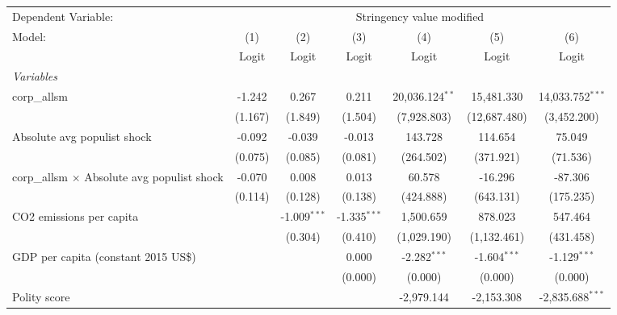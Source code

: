 
\begingroup
\centering
\begin{tabular}{lcccccc}
   \toprule
   Dependent Variable: & \multicolumn{6}{c}{Stringency value modified}\\
   Model:                                             & (1)     & (2)            & (3)            & (4)               & (5)            & (6)\\  
                                                      &  Logit  & Logit          & Logit          & Logit             & Logit          & Logit\\  
   \midrule
   \emph{Variables}\\
   corp\_allsm                                        & -1.242  & 0.267          & 0.211          & 20,036.124$^{**}$ & 15,481.330     & 14,033.752$^{***}$\\   
                                                      & (1.167) & (1.849)        & (1.504)        & (7,928.803)       & (12,687.480)   & (3,452.200)\\   
   Absolute avg populist shock                        & -0.092  & -0.039         & -0.013         & 143.728           & 114.654        & 75.049\\   
                                                      & (0.075) & (0.085)        & (0.081)        & (264.502)         & (371.921)      & (71.536)\\   
   corp\_allsm $\times$ Absolute avg populist shock   & -0.070  & 0.008          & 0.013          & 60.578            & -16.296        & -87.306\\   
                                                      & (0.114) & (0.128)        & (0.138)        & (424.888)         & (643.131)      & (175.235)\\   
   CO2 emissions per capita                           &         & -1.009$^{***}$ & -1.335$^{***}$ & 1,500.659         & 878.023        & 547.464\\   
                                                      &         & (0.304)        & (0.410)        & (1,029.190)       & (1,132.461)    & (431.458)\\   
   GDP per capita (constant 2015 US\$)                &         &                & 0.000          & -2.282$^{***}$    & -1.604$^{***}$ & -1.129$^{***}$\\   
                                                      &         &                & (0.000)        & (0.000)           & (0.000)        & (0.000)\\   
   Polity score                                       &         &                &                & -2,979.144        & -2,153.308     & -2,835.688$^{***}$\\   

\end{tabular}
